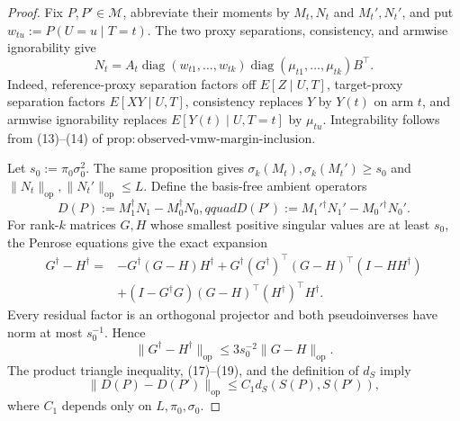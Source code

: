 \documentclass{article}
\begin{document}
\begin{proof}
Fix \(P,P'\in\mathcal M\), abbreviate their moments by \(M_t,N_t\) and \(M_t',N_t'\), and put \(w_{tu}:=P(U=u\mid T=t)\).  The two proxy separations, consistency, and armwise ignorability give
\[
N_t=A_t\operatorname{diag}(w_{t1},\ldots,w_{tk})
\operatorname{diag}(\mu_{t1},\ldots,\mu_{tk})B^\top.                           \tag{16}
\]
Indeed, reference-proxy separation factors off \(E[Z\mid U,T]\), target-proxy separation factors \(E[XY\mid U,T]\), consistency replaces \(Y\) by \(Y(t)\) on arm \(t\), and armwise ignorability replaces \(E[Y(t)\mid U,T=t]\) by \(\mu_{tu}\).  Integrability follows from (13)--(14) of \(\mathrm{prop:observed\text{-}vmw\text{-}margin\text{-}inclusion}\).

Let \(s_0:=\pi_0\sigma_0^2\).  The same proposition gives \(\sigma_k(M_t),\sigma_k(M_t')\ge s_0\) and \(\lVert N_t\rVert_{\mathrm{op}},\lVert N_t'\rVert_{\mathrm{op}}\le L\).  Define the basis-free ambient operators
\[
D(P):=M_1^\dagger N_1-M_0^\dagger N_0,qquad
D(P'):=M_1'{}^\dagger N_1'-M_0'{}^\dagger N_0'.                               \tag{17}
\]
For rank-\(k\) matrices \(G,H\) whose smallest positive singular values are at least \(s_0\), the Penrose equations give the exact expansion
\[
\begin{aligned}
G^\dagger-H^\dagger={}&-G^\dagger(G-H)H^\dagger
+G^\dagger(G^\dagger)^\top(G-H)^\top(I-HH^\dagger)\\
&+(I-G^\dagger G)(G-H)^\top(H^\dagger)^\top H^\dagger.
\end{aligned}                                                                  \tag{18}
\]
Every residual factor is an orthogonal projector and both pseudoinverses have norm at most \(s_0^{-1}\).  Hence
\[
\lVert G^\dagger-H^\dagger\rVert_{\mathrm{op}}
\le3s_0^{-2}\lVert G-H\rVert_{\mathrm{op}}.                                  \tag{19}
\]
The product triangle inequality, (17)--(19), and the definition of \(d_S\) imply
\[
\lVert D(P)-D(P')\rVert_{\mathrm{op}}
\le C_1d_S(S(P),S(P')),                                                        \tag{20}
\]
where \(C_1\) depends only on \(L,\pi_0,\sigma_0\).


\end{proof}
\end{document}
